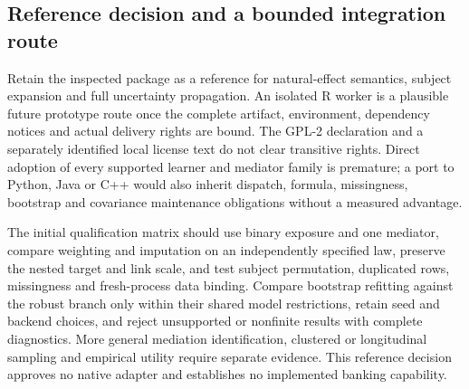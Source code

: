 \subsection{Reference decision and a bounded integration route}
\label{exec23:medflex-decision}
Retain the inspected package as a reference for natural-effect semantics,
subject expansion and full uncertainty propagation. An isolated R worker
is a plausible future prototype route once the complete artifact, environment,
dependency notices and actual delivery rights are bound. The GPL-2 declaration
and a separately identified local license text do not clear transitive rights.
Direct adoption of every supported learner and mediator family is premature;
a port to Python, Java or C++ would also inherit dispatch, formula, missingness,
bootstrap and covariance maintenance obligations without a measured advantage.
\citep{exec23_medflex_sources}

The initial qualification matrix should use binary exposure and one mediator,
compare weighting and imputation on an independently specified law, preserve
the nested target and link scale, and test subject permutation, duplicated
rows, missingness and fresh-process data binding. Compare bootstrap refitting
against the robust branch only within their shared model restrictions,
retain seed and backend choices, and reject unsupported or nonfinite results
with complete diagnostics. More general mediation identification, clustered
or longitudinal sampling and empirical utility require separate evidence.
This reference decision approves no native adapter and establishes no
implemented banking capability.
